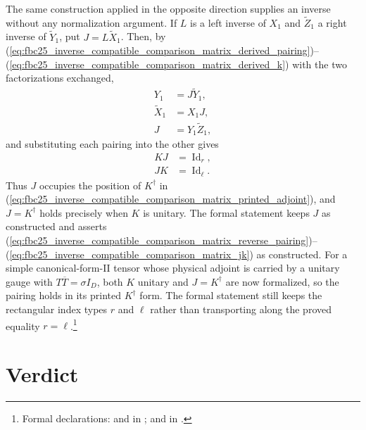 \documentclass{article}
\begin{document}
The same construction applied in the opposite direction supplies an inverse
without any normalization argument. If $L$ is a left inverse of $X_1$ and
$\tilde Z_1$ a right inverse of $\tilde Y_1$, put $J=L\tilde X_1$. Then, by
(\ref{eq:fbc25_inverse_compatible_comparison_matrix_derived_pairing})--(\ref{eq:fbc25_inverse_compatible_comparison_matrix_derived_k})
with the two factorizations exchanged,
\begin{align}
    Y_1
     & =J\tilde Y_1,
    \label{eq:fbc25_inverse_compatible_comparison_matrix_reverse_pairing} \\
    \tilde X_1
     & =X_1J,
    \label{eq:fbc25_inverse_compatible_comparison_matrix_reverse_factor} \\
    J
     & =Y_1\tilde Z_1,
    \label{eq:fbc25_inverse_compatible_comparison_matrix_reverse_j}
\end{align}
and substituting each pairing into the other gives
\begin{align}
    KJ
     & =\operatorname{Id}_r,
    \label{eq:fbc25_inverse_compatible_comparison_matrix_kj} \\
    JK
     & =\operatorname{Id}_\ell.
    \label{eq:fbc25_inverse_compatible_comparison_matrix_jk}
\end{align}
Thus $J$ occupies the position of $K^\dagger$ in
(\ref{eq:fbc25_inverse_compatible_comparison_matrix_printed_adjoint}), and
$J=K^\dagger$ holds precisely when $K$ is unitary. The formal statement keeps
$J$ as constructed and asserts
(\ref{eq:fbc25_inverse_compatible_comparison_matrix_reverse_pairing})--(\ref{eq:fbc25_inverse_compatible_comparison_matrix_jk})
as constructed. For a simple canonical-form-II tensor whose physical adjoint is
carried by a unitary gauge with $T\overline T=\sigma I_D$, both $K$ unitary and
$J=K^\dagger$ are now formalized, so the pairing holds in its printed
$K^\dagger$ form. The formal statement still keeps the rectangular index types
$r$ and $\ell$ rather than transporting along the proved equality
$r=\ell$.\footnote{Formal declarations:
     and
    in ;
     and
    in .}

\section{Verdict}
\end{document}
